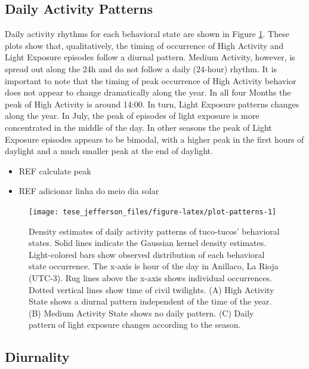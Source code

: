 \documentclass[english,msc,numbers,hidelinks]{coppe}
\providecommand{\tightlist}{%
  \setlength{\itemsep}{0pt}\setlength{\parskip}{0pt}}
\begin{document}
  \hypertarget{daily-activity-patterns}{%
  \subsection{Daily Activity Patterns}\label{daily-activity-patterns}}

  Daily activity rhythms for each behavioral state are shown in Figure \ref{fig:plot-patterns}. These plots show that, qualitatively, the timing of occurrence of High Activity and Light Exposure episodes follow a diurnal pattern. Medium Activity, however, is spread out along the 24h and do not follow a daily (24-hour) rhythm. It is important to note that the timing of peak occurrence of High Activity behavior does not appear to change dramatically along the year. In all four Months the peak of High Activity is around 14:00. In turn, Light Exposure patterns changes along the year. In July, the peak of episodes of light exposure is more concentrated in the middle of the day. In other seasons the peak of Light Exposure episodes appears to be bimodal, with a higher peak in the first hours of daylight and a much smaller peak at the end of daylight.
  \begin{itemize}
  \tightlist
  \item
    REF calculate peak
  \item
    REF adicionar linha do meio dia solar
  \end{itemize}
  \begin{figure}

  {\centering \texttt{[image: tese\_jefferson\_files/figure-latex/plot-patterns-1]} 

  }

  \caption{Density estimates of daily activity patterns of tuco-tucos' behavioral states. Solid lines indicate the Gaussian kernel density estimates. Light-colored bars show observed distribution of each behavioral state occurrence. The x-axis is hour of the day in Anillaco, La Rioja (UTC-3). Rug lines above the x-axis shows individual occurrences. Dotted vertical lines show time of civil twilights. (A) High Activity State shows a diurnal pattern independent of the time of the year. (B) Medium Activity State shows no daily pattern. (C) Daily pattern of light exposure changes according to the season.}\label{fig:plot-patterns}
  \end{figure}
  \newpage

  \hypertarget{diurnality}{%
  \subsection{Diurnality}\label{diurnality}}
\end{document}

